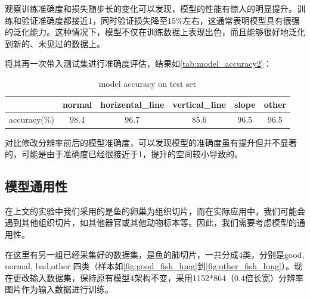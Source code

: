 观察训练准确度和损失随步长的变化可以发现，模型的性能有惊人的明显提升。训练和验证准确度都接近1，同时验证损失降至15\%左右，这通常表明模型具有很强的泛化能力。这种情况下，模型不仅在训练数据上表现出色，而且能够很好地泛化到新的、未见过的数据上。

将其再一次带入测试集进行准确度评估，结果如\autoref{tab:model_accuracy2}：

\begin{table}
    \centering
    \caption{model accuracy on test set}
    \begin{tabular}{cccccc}
        \toprule
        & normal & horizental\_line & vertical\_line & slope & other \\
        \midrule
        accuracy(\%) & 98.4 & 96.7 & 85.6 & 96.5 & 96.5 \\
        \bottomrule
    \end{tabular}
    \label{tab:model_accuracy2}
    \end{table}

对比修改分辨率前后的模型准确度，可以发现模型的准确度虽有提升但并不显著的，可能是由于准确度已经很接近于1，提升的空间较小导致的。


\subsection{模型通用性}

在上文的实验中我们采用的是鱼的卵巢为组织切片，而在实际应用中，我们可能会遇到其他组织切片，如其他器官或其他动物标本等。因此，我们需要考虑模型的通用性。

在这里有另一组已经采集好的数据集，是鱼的肺切片，一共分成4类，分别是good, normal, bad,other 四类（样本如\autoref{fig:good_fish_lung}到\autoref{fig:other_fish_lung}）。现在更改输入数据集，保持原有模型4架构不变，采用1152*864（0.4倍长宽）分辨率图片作为输入数据进行训练。

